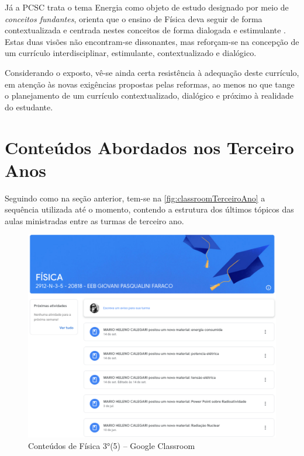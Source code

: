 Já a \ac{PCSC} trata o tema Energia como objeto de estudo designado por meio de \emph{conceitos fundantes}, orienta que o ensino de Física deva seguir de forma contextualizada e centrada nestes conceitos de forma dialogada e estimulante \cite[p.~164]{BRASIL:2017}. Estas duas visões não encontram-se dissonantes, mas reforçam-se na concepção de um currículo interdisciplinar, estimulante, contextualizado e dialógico.

Considerando o exposto, vê-se ainda certa resistência à adequação deste currículo, em atenção às novas exigências propostas pelas reformas, ao menos no que tange o planejamento de um currículo contextualizado, dialógico e próximo à realidade do estudante.

\section{Conteúdos Abordados nos Terceiro Anos}
Seguindo como na seção anterior, tem-se na \autoref{fig:classroomTerceiroAno} a sequência utilizada até o momento, contendo a estrutura dos últimos tópicos das aulas ministradas entre as turmas de terceiro ano.
\vspace{.5cm} 
\begin{figure}[!ht]
    \begin{center}
        \includegraphics[width=\textwidth]{03-elementos/03.2_textual/03.2.1_fig/programaFisica3-5.png}
        \caption{Conteúdos de Física 3°(5) -- Google Classroom}
        \label{fig:classroomTerceiroAno}
    \end{center}    
\end{figure}

